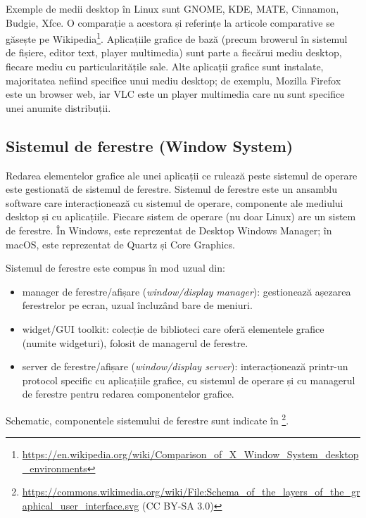 Exemple de medii desktop în Linux sunt GNOME, KDE, MATE, Cinnamon, Budgie, Xfce.
O comparație a acestora și referințe la articole comparative se găsește pe Wikipedia\footnote{\url{https://en.wikipedia.org/wiki/Comparison\_of\_X\_Window\_System\_desktop\_environments}}.
Aplicațiile grafice de bază (precum browerul în sistemul de fișiere, editor text, player multimedia) sunt parte a fiecărui mediu desktop, fiecare mediu cu particularitățile sale.
Alte aplicații grafice sunt instalate, majoritatea nefiind specifice unui mediu desktop;
de exemplu, Mozilla Firefox este un browser web, iar VLC este un player multimedia care nu sunt specifice unei anumite distribuții.

\subsection{Sistemul de ferestre (Window System)}
\label{sec:ui:window-system}

Redarea elementelor grafice ale unei aplicații ce rulează peste sistemul de operare este gestionată de sistemul de ferestre.
Sistemul de ferestre este un ansamblu software care interacționează cu sistemul de operare, componente ale mediului desktop și cu aplicațiile.
Fiecare sistem de operare (nu doar Linux) are un sistem de ferestre.
În Windows, este reprezentat de Desktop Windows Manager;
în macOS, este reprezentat de Quartz și Core Graphics.

Sistemul de ferestre este compus în mod uzual din:

\begin{itemize}
  \item manager de ferestre/afișare (\textit{window/display manager}): gestionează așezarea ferestrelor pe ecran, uzual încluzând bare de meniuri.
  \item widget/GUI toolkit: colecție de biblioteci care oferă elementele grafice (numite widgeturi), folosit de managerul de ferestre.
  \item server de ferestre/afișare (\textit{window/display server}): interacționează printr-un protocol specific cu aplicațiile grafice, cu sistemul de operare și cu managerul de ferestre pentru redarea componentelor grafice.
\end{itemize}

Schematic, componentele sistemului de ferestre sunt indicate în \footnote{\url{https://commons.wikimedia.org/wiki/File:Schema_of_the_layers_of_the_graphical_user_interface.svg} (CC BY-SA 3.0)}.


